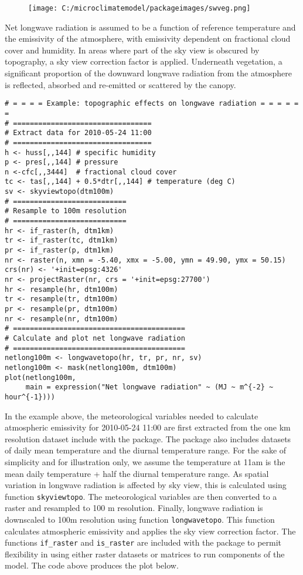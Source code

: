 \documentclass[]{article}
\begin{document}
\begin{figure}
\centering
\texttt{[image: C:/microclimatemodel/packageimages/swveg.png]}
\caption{}
\end{figure}

Net longwave radiation is assumed to be a function of reference
temperature and the emissivity of the atmosphere, with emissivity
dependent on fractional cloud cover and humidity. In areas where part of
the sky view is obscured by topography, a sky view correction factor is
applied. Underneath vegetation, a significant proportion of the downward
longwave radiation from the atmosphere is reflected, absorbed and
re-emitted or scattered by the canopy.

\begin{verbatim}
# = = = = Example: topographic effects on longwave radiation = = = = = = 
# =================================
# Extract data for 2010-05-24 11:00
# =================================
h <- huss[,,144] # specific humidity
p <- pres[,,144] # pressure
n <-cfc[,,3444]  # fractional cloud cover
tc <- tas[,,144] + 0.5*dtr[,,144] # temperature (deg C)
sv <- skyviewtopo(dtm100m)
# ===========================
# Resample to 100m resolution
# ===========================
hr <- if_raster(h, dtm1km)
tr <- if_raster(tc, dtm1km)
pr <- if_raster(p, dtm1km)
nr <- raster(n, xmn = -5.40, xmx = -5.00, ymn = 49.90, ymx = 50.15)
crs(nr) <- '+init=epsg:4326'
nr <- projectRaster(nr, crs = '+init=epsg:27700')
hr <- resample(hr, dtm100m)
tr <- resample(tr, dtm100m)
pr <- resample(pr, dtm100m)
nr <- resample(nr, dtm100m)
# =========================================
# Calculate and plot net longwave radiation
# =========================================
netlong100m <- longwavetopo(hr, tr, pr, nr, sv)
netlong100m <- mask(netlong100m, dtm100m)
plot(netlong100m, 
     main = expression("Net longwave radiation" ~ (MJ ~ m^{-2} ~   hour^{-1})))
\end{verbatim}

In the example above, the meteorological variables needed to calculate
atmospheric emissivity for 2010-05-24 11:00 are first extracted from the
one km resolution dataset include with the package. The package also
includes datasets of daily mean temperature and the diurnal temperature
range. For the sake of simplicity and for illustration only, we assume
the temperature at 11am is the mean daily temperature + half the diurnal
temperature range. As spatial variation in longwave radiation is
affected by sky view, this is calculated using function
\texttt{skyviewtopo}. The meteorological variables are then converted to
a raster and resampled to 100 m resolution. Finally, longwave radiation
is downscaled to 100m resolution using function \texttt{longwavetopo}.
This function calculates atmospheric emissivity and applies the sky view
correction factor. The functions \texttt{if\_raster} and
\texttt{is\_raster} are included with the package to permit flexibility
in using either raster datasets or matrices to run components of the
model. The code above produces the plot below.
\end{document}
